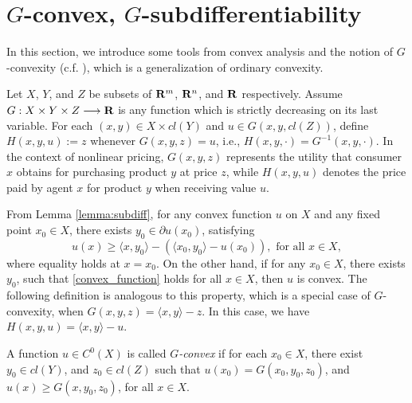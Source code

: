 \section{$G$-convex, $G$-subdifferentiability}\label{section:G-convexity}
In this section, we introduce some tools from convex analysis and the notion of $G$-convexity  (c.f. \cite{Trudinger14,Balder77,Singer97}), which is a generalization of ordinary convexity. \medskip

Let $X$, $Y$, and $Z$ be subsets of ${\mathbf R}^m$, ${\mathbf R}^n$, and ${\mathbf R}$ respectively. Assume $G: X \times Y \times Z \longrightarrow {\mathbf R}$ is any function which is strictly decreasing on its last variable. For each $(x, y) \in X\times cl(Y)$ and $u\in G(x,y, cl(Z))$, define $H(x,y,u) := z$ whenever $G(x,y,z) = u$, i.e., $H(x, y, \cdot)= G^{-1}(x,y,\cdot)$. In the context of nonlinear pricing, $G(x,y,z)$ represents the utility that consumer $x$ obtains for purchasing product $y$ at price $z$, while $H(x,y,u)$ denotes the price paid by agent $x$ for product $y$ when receiving value $u$. \medskip


From Lemma \ref{lemma:subdiff}, for any convex function $u$ on $X$ and any fixed point $x_0 \in X$, there exists $y_0 \in \partial u(x_0)$, satisfying%
\begin{equation}\label{convex_function}
	u(x) \ge  \langle x , y_0\rangle -( \langle x_0, y_0\rangle -  u(x_0)),	\text{  for all $x \in X$},
\end{equation} 
where equality holds at $x = x_0$. On the other hand, if for any $x_0\in X$, there exists $y_0$, such that \eqref{convex_function} holds for all $x\in X$, then $u$ is convex. The following definition is analogous to this property, which is a special case of $G$-convexity, when $G(x,y,z) = \langle x, y \rangle -z$. In this case, we have $H(x,y,u) = \langle x, y \rangle -u$. \medskip
	
\begin{definition}[$G$-convexity]\label{defn:GConvexity}
 A function $u\in C^0(X)$ is called {\it $G$-convex} if for each $x_0 \in X$, there exist $y_0 \in   cl(Y)$, and $z_0 \in  cl(Z)$ such that $u(x_0)=G(x_0, y_0, z_0)$, and $u(x)\ge G(x, y_0, z_0)$, for all $x\in X$.
\end{definition}
		
		
